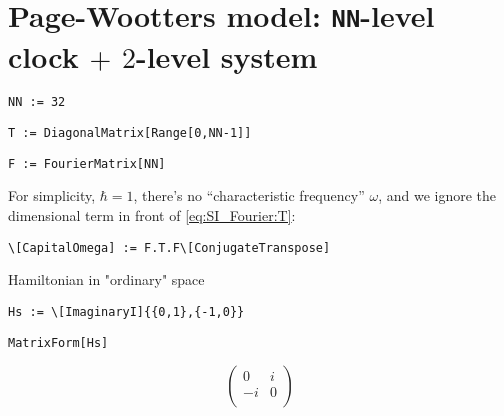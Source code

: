 \section{Page-Wootters model: \texttt{NN}-level clock $+$ $2$-level system}

\begin{lstlisting}
NN := 32
\end{lstlisting}

\begin{lstlisting}
T := DiagonalMatrix[Range[0,NN-1]]
\end{lstlisting}

\begin{lstlisting}
F := FourierMatrix[NN]
\end{lstlisting}

For simplicity, $\hbar = 1$, there's no ``characteristic frequency'' $\omega$,
and we ignore the dimensional term in front of \eqref{eq:SI_Fourier:T}:

\begin{lstlisting}
\[CapitalOmega] := F.T.F\[ConjugateTranspose] 
\end{lstlisting}

Hamiltonian in "ordinary" space
\begin{lstlisting}
Hs := \[ImaginaryI]{{0,1},{-1,0}}
\end{lstlisting}
\begin{lstlisting}
MatrixForm[Hs]
\end{lstlisting}
\[
  \left(
    \begin{array}{cc}
     0 & i \\
     -i & 0 \\
    \end{array}
    \right)
\]

